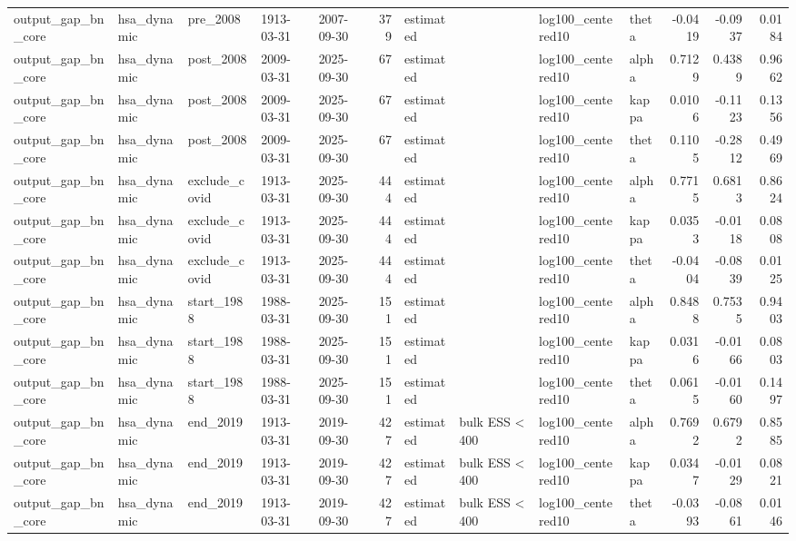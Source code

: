 \begin{tabular}{lllllrllllrrr}
output\_gap\_bn\_core & hsa\_dynamic & pre\_2008 & 1913-03-31 & 2007-09-30 & 379 & estimated &  & log100\_centered10 & theta & -0.0419 & -0.0937 & 0.0184 \\
output\_gap\_bn\_core & hsa\_dynamic & post\_2008 & 2009-03-31 & 2025-09-30 & 67 & estimated &  & log100\_centered10 & alpha & 0.7129 & 0.4389 & 0.9662 \\
output\_gap\_bn\_core & hsa\_dynamic & post\_2008 & 2009-03-31 & 2025-09-30 & 67 & estimated &  & log100\_centered10 & kappa & 0.0106 & -0.1123 & 0.1356 \\
output\_gap\_bn\_core & hsa\_dynamic & post\_2008 & 2009-03-31 & 2025-09-30 & 67 & estimated &  & log100\_centered10 & theta & 0.1105 & -0.2812 & 0.4969 \\
output\_gap\_bn\_core & hsa\_dynamic & exclude\_covid & 1913-03-31 & 2025-09-30 & 444 & estimated &  & log100\_centered10 & alpha & 0.7715 & 0.6813 & 0.8624 \\
output\_gap\_bn\_core & hsa\_dynamic & exclude\_covid & 1913-03-31 & 2025-09-30 & 444 & estimated &  & log100\_centered10 & kappa & 0.0353 & -0.0118 & 0.0808 \\
output\_gap\_bn\_core & hsa\_dynamic & exclude\_covid & 1913-03-31 & 2025-09-30 & 444 & estimated &  & log100\_centered10 & theta & -0.0404 & -0.0839 & 0.0125 \\
output\_gap\_bn\_core & hsa\_dynamic & start\_1988 & 1988-03-31 & 2025-09-30 & 151 & estimated &  & log100\_centered10 & alpha & 0.8488 & 0.7535 & 0.9403 \\
output\_gap\_bn\_core & hsa\_dynamic & start\_1988 & 1988-03-31 & 2025-09-30 & 151 & estimated &  & log100\_centered10 & kappa & 0.0316 & -0.0166 & 0.0803 \\
output\_gap\_bn\_core & hsa\_dynamic & start\_1988 & 1988-03-31 & 2025-09-30 & 151 & estimated &  & log100\_centered10 & theta & 0.0615 & -0.0160 & 0.1497 \\
output\_gap\_bn\_core & hsa\_dynamic & end\_2019 & 1913-03-31 & 2019-09-30 & 427 & estimated & bulk ESS < 400 & log100\_centered10 & alpha & 0.7692 & 0.6792 & 0.8585 \\
output\_gap\_bn\_core & hsa\_dynamic & end\_2019 & 1913-03-31 & 2019-09-30 & 427 & estimated & bulk ESS < 400 & log100\_centered10 & kappa & 0.0347 & -0.0129 & 0.0821 \\
output\_gap\_bn\_core & hsa\_dynamic & end\_2019 & 1913-03-31 & 2019-09-30 & 427 & estimated & bulk ESS < 400 & log100\_centered10 & theta & -0.0393 & -0.0861 & 0.0146 \\

\end{tabular}

